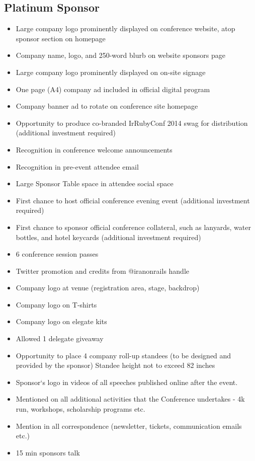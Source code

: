 \documentclass[a4paper,12pt]{article}
\begin{document}
\subsection*{Platinum Sponsor}
\begin{itemize}

\item{Large company logo prominently displayed on conference website, atop sponsor section on homepage}

\item{Company name, logo, and 250-word blurb on website sponsors page}

\item{Large company logo prominently displayed on on-site signage}

\item{One page (A4) company ad included in official digital program}

\item{Company banner ad to rotate on conference site homepage}
\item{Opportunity to produce co-branded IrRubyConf 2014 swag for distribution (additional investment required)}
\item{Recognition in conference welcome announcements}
\item{Recognition in pre-event attendee email}
\item{Large Sponsor Table space in attendee social space}
\item{First chance to host official conference evening event (additional investment required)}
\item{First chance to sponsor official conference collateral, such as lanyards, water bottles, and
  hotel keycards (additional investment required)}
\item{6 conference session passes}
\item{Twitter promotion and credits from @iranonrails handle}
\item{Company logo at venue (registration area, stage, backdrop)}
\item{Company logo on T-shirts}
\item{Company logo on elegate kits}
\item{Allowed 1 delegate giveaway}
\item{Opportunity to place 4 company roll-up standees (to be designed and provided by the sponsor) Standee height not to exceed 82 inches}
\item{Sponsor`s logo in videos of all speeches published online after the event.}
\item{Mentioned on all additional activities that the Conference undertakes - 4k
  run, workshops, scholarship programs etc.}

\item{Mention in all correspondence (newsletter, tickets, communication emails
  etc.)}
\item{15 min sponsors talk}

\end{itemize}
\end{document}

